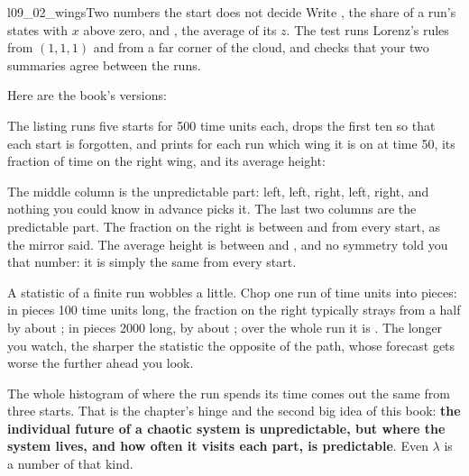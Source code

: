 \begin{lab}{l09_02_wings}{Two numbers the start does not decide}
Write , the share of a run's states with $x$ above zero,
and , the average of its $z$. The test runs Lorenz's rules
from $(1, 1, 1)$ and from a far corner of the cloud, and checks that your two
summaries agree between the runs.
\end{lab}

\noindent
Here are the book's versions:


\noindent
The listing runs five starts for 500 time units each, drops the first ten so
that each start is forgotten, and prints for each run which wing it is on at
time 50, its fraction of time on the right wing, and its average height:


\noindent
The middle column is the unpredictable part: left, left, right, left, right,
and nothing you could know in advance picks it. The last two columns are the
predictable part. The fraction on the right is between  and
 from every start, as the mirror said. The average height
is between  and , and no symmetry
told you that number: it is simply the same from every start.

A statistic of a finite run wobbles a little. Chop one run of
 time units into pieces: in pieces 100 time units long,
the fraction on the right typically strays from a half by about
; in pieces 2000 long, by about
; over the whole run it is . The
longer you watch, the sharper the statistic \dash{} the opposite of the path,
whose forecast gets worse the further ahead you look.


\noindent
The whole histogram of where the run spends its time comes out the same from
three starts. That is the chapter's hinge and the second big idea of this
book: \textbf{the individual future of a chaotic
system is unpredictable, but where the system lives, and how often it visits
each part, is predictable}. Even $\lambda$ is a number of that kind.


